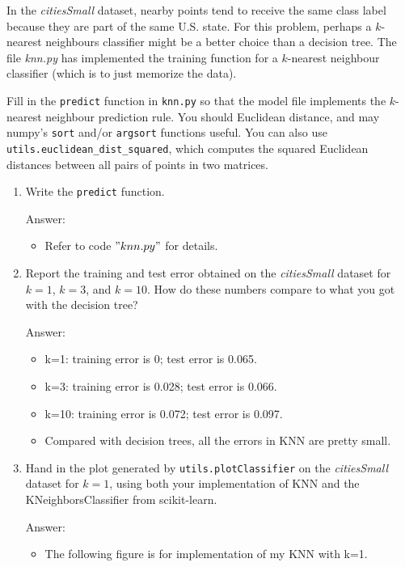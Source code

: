 \documentclass{article}
\def\blu#1{{\color{blu}#1}}
\def\gre#1{{\color{gre}#1}}
\def\enum#1{\begin{enumerate}#1\end{enumerate}}
\begin{document}
In the \emph{citiesSmall} dataset, nearby points tend to receive the same class label because they are part of the same U.S. state. For this problem, perhaps a $k$-nearest neighbours classifier might be a better choice than a decision tree. The file \emph{knn.py} has implemented the training function for a $k$-nearest neighbour classifier (which is to just memorize the data).




Fill in the \texttt{predict} function in \texttt{knn.py} so that the model file implements the $k$-nearest neighbour prediction rule.
You should Euclidean distance, and may numpy's \texttt{sort} and/or \texttt{argsort} functions useful.
You can also use \texttt{utils.euclidean\string_dist\string_squared}, which computes the squared Euclidean distances between all pairs of points in two matrices.
\blu{
\enum{
\item Write the \texttt{predict} function.\\
\gre{
Answer:
\begin{itemize}
	\item Refer to code $"knn.py"$ for details.
\end{itemize}}
\item Report  the training and test error obtained on the \emph{citiesSmall} dataset for $k=1$, $k=3$, and $k=10$. How do these numbers compare to what you got with the decision tree? \\
\gre{
	Answer:
	\begin{itemize}
		\item k=1: training error is 0; test error is 0.065.
		\item k=3: training error is 0.028; test error is 0.066.
		\item k=10: training error is 0.072; test error is 0.097.
		\item Compared with decision trees, all the errors in KNN are pretty small.
\end{itemize}}
\item Hand in the plot generated by \texttt{utils.plotClassifier} on the \emph{citiesSmall} dataset for $k=1$, using both your implementation of KNN and the KNeighborsClassifier from scikit-learn. \\
\gre{Answer:
\begin{itemize}
	\item The following figure is for implementation of my KNN with k=1.
\end{itemize}}
\begin{figure}[H]
	\centering

\end{figure}}}
\end{document}
